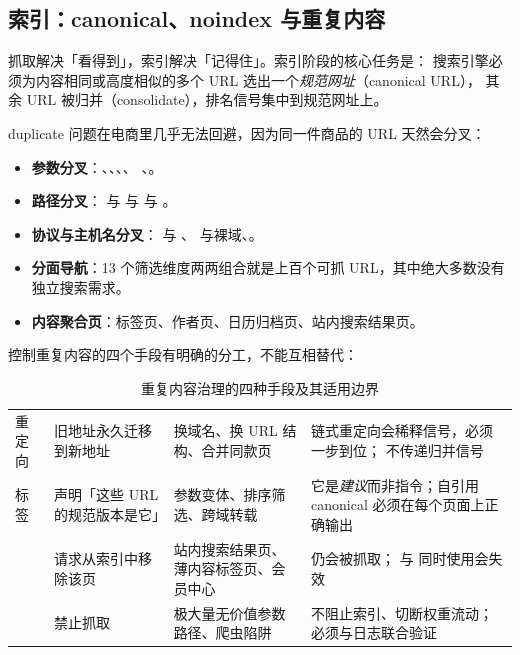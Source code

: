 \subsection{索引：canonical、noindex 与重复内容}

抓取解决「看得到」，索引解决「记得住」。索引阶段的核心任务是：
搜索引擎必须为内容相同或高度相似的多个 URL 选出一个\emph{规范网址}（canonical URL），
其余 URL 被归并（consolidate），排名信号集中到规范网址上。

duplicate 问题在电商里几乎无法回避，因为同一件商品的 URL 天然会分叉：

\begin{itemize}
  \item \textbf{参数分叉}：、、、、
        、。
  \item \textbf{路径分叉}： 与  与  与 。
  \item \textbf{协议与主机名分叉}： 与 、 与裸域、。
  \item \textbf{分面导航}：13 个筛选维度两两组合就是上百个可抓 URL，其中绝大多数没有独立搜索需求。
  \item \textbf{内容聚合页}：标签页、作者页、日历归档页、站内搜索结果页。
\end{itemize}

控制重复内容的四个手段有明确的分工，不能互相替代：

\begin{table}[htbp]
\centering
\caption{重复内容治理的四种手段及其适用边界}
\label{tab:dedup}
\small
\begin{tabularx}{\textwidth}{L{2.0cm} L{3.0cm} L{2.9cm} Y}
\toprule
{} &  &  &  \\
\midrule
{} 重定向 & 旧地址永久迁移到新地址 & 换域名、换 URL 结构、合并同款页 & 链式重定向会稀释信号，必须一步到位； 不传递归并信号 \\
 标签 & 声明「这些 URL 的规范版本是它」 & 参数变体、排序筛选、跨域转载 & 它是\emph{建议}而非指令；自引用 canonical 必须在每个页面上正确输出 \\
 & 请求从索引中移除该页 & 站内搜索结果页、薄内容标签页、会员中心 & 仍会被抓取； 与  同时使用会失效 \\
 & 禁止抓取 & 极大量无价值参数路径、爬虫陷阱 & 不阻止索引、切断权重流动；必须与日志联合验证 \\
\bottomrule
\end{tabularx}
\end{table}


